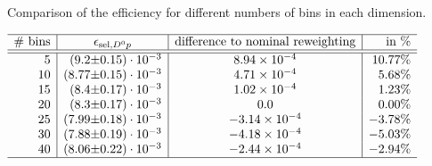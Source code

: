  
\begin{table}[tb]
    \centering
    \caption{Comparison of the efficiency \effSelDp for different numbers of bins in each dimension.}
    \label{tab:systematic_effD0p_nbins}
    $\begin{array}{r|r@{\pm}l|c|r}
    \hline
    \text{\# bins}  & \multicolumn{2}{c|}{\effSelDp}  & \text{difference to nominal reweighting} & \text{in \%} \\ \hline \hline
5 & (9.2 & 0.15) \cdot 10^{-3} & \num[round-mode=figures, round-precision=3]{0.000893867513509} & 10.77\%\\ 10 & (8.77 & 0.15) \cdot 10^{-3} & \num[round-mode=figures, round-precision=3]{0.000471373232304} & 5.68\%\\ 15 & (8.4 & 0.17) \cdot 10^{-3} & \num[round-mode=figures, round-precision=3]{0.000101756679921} & 1.23\%\\ 20 & (8.3 & 0.17) \cdot 10^{-3} & \num[round-mode=figures, round-precision=3]{0.0} & 0.00\%\\ 25 & (7.99 & 0.18) \cdot 10^{-3} & \num[round-mode=figures, round-precision=3]{-0.000313870153072} & -3.78\%\\ 30 & (7.88 & 0.19) \cdot 10^{-3} & \num[round-mode=figures, round-precision=3]{-0.000418015648779} & -5.03\%\\ 40 & (8.06 & 0.22) \cdot 10^{-3} & \num[round-mode=figures, round-precision=3]{-0.000243686560501} & -2.94\%\\ 
    \hline
    \end{array}$
\end{table}
